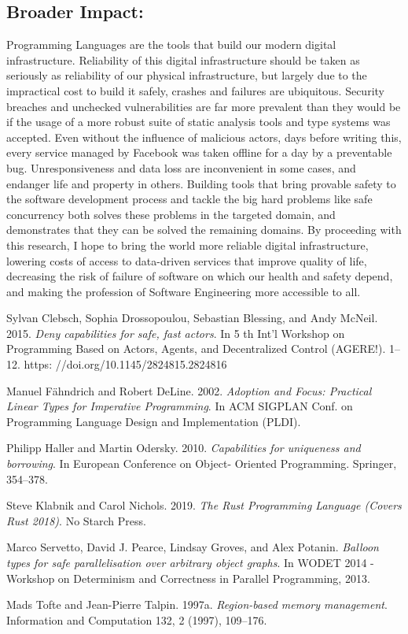 \documentclass{nsf-grfp}
\begin{document}
\subsection*{Broader Impact:} Programming Languages are the tools that build our modern digital infrastructure. Reliability of this digital infrastructure should be taken as seriously as reliability of our physical infrastructure, but largely due to the impractical cost to build it safely, crashes and failures are ubiquitous. Security breaches and unchecked vulnerabilities are far more prevalent than they would be if the usage of a more robust suite of static analysis tools and type systems was accepted. Even without the influence of malicious actors, days before writing this, every service managed by Facebook was taken offline for a day by a preventable bug. Unresponsiveness and data loss are inconvenient in some cases, and endanger life and property in others. Building tools that bring provable safety to the software development process and tackle the big hard problems like safe concurrency both solves these problems in the targeted domain, and demonstrates that they can be solved the remaining domains. By proceeding with this research, I hope to bring the world more reliable digital infrastructure, lowering costs of access to data-driven services that improve quality of life, decreasing the risk of failure of software on which our health and safety depend, and making the profession of Software Engineering more accessible to all.

\begin{thebibliography}{9}

Sylvan Clebsch, Sophia Drossopoulou, Sebastian Blessing, and Andy McNeil. 2015. \textit{Deny capabilities for safe, fast actors}.
In 5 th Int’l Workshop on Programming Based on Actors, Agents, and Decentralized Control (AGERE!). 1–12. https:
//doi.org/10.1145/2824815.2824816


Manuel Fähndrich and Robert DeLine. 2002. \textit{Adoption and Focus: Practical Linear Types for Imperative Programming}. In
ACM SIGPLAN Conf. on Programming Language Design and Implementation (PLDI).

Philipp Haller and Martin Odersky. 2010. \textit{Capabilities for uniqueness and borrowing}. In European Conference on Object-
Oriented Programming. Springer, 354–378.

Steve Klabnik and Carol Nichols. 2019. \textit{The Rust Programming Language (Covers Rust 2018)}. No Starch Press.

Marco Servetto, David J. Pearce, Lindsay Groves, and Alex Potanin. \textit{Balloon types for safe
parallelisation over arbitrary object graphs}. In WODET 2014 - Workshop on Determinism and
Correctness in Parallel Programming, 2013.

Mads Tofte and Jean-Pierre Talpin. 1997a. \textit{Region-based memory management}. Information and Computation 132, 2 (1997),
109–176.

\end{thebibliography}
\end{document}
